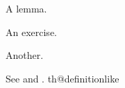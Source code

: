 \begin{lemma}\flmLabels{\label{ref1}}\noproofref A lemma.
\end{lemma}

\begin{exercise}\flmLabels{\label{ref2}}
An exercise.
\end{exercise}

\begin{exercise}\flmLabels{\label{ref3}}
Another.
\end{exercise}

See  and .
\RequirePackage{amsthm}
\RequirePackage{zref-clever}
\ProvideDocumentCommand\noproofref{}{}
\ifcsname th@definitionlike\endcsname\else{}\fi
\ProvideDocumentCommand{}
%
%
